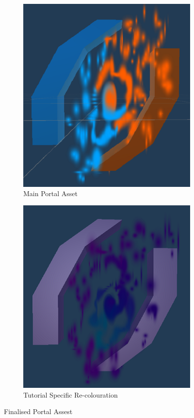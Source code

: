 \begin{figure}[H]
\centering
\begin{subfigure}{0.5\textwidth}
  \centering
  \includegraphics[width=1\linewidth]{Figures/finporta.png}
  \caption{Main Portal Asset}
\end{subfigure}%
\begin{subfigure}{0.5\textwidth}
  \centering
  \includegraphics[width=1\linewidth]{Figures/finportb.png}
  \caption{Tutorial Specific Re-colouration}
\end{subfigure}
\caption{Finalised Portal Assest}
\end{figure}



